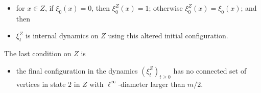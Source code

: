 \documentclass{article}
\numberwithin{equation}{section}
\begin{document}
\begin{itemize}
\item for $x \in Z$, if $\xi_0(x) = 0$, then $\xi_0^Z(x) = 1$; otherwise $\xi_0^Z(x) = \xi_0(x)$; and then
    \item $\xi_t^Z$  is internal dynamics on $Z$ using this altered initial configuration.
\end{itemize}
The last condition on $Z$ is 
\begin{itemize}[leftmargin=1.25cm]
    \item[(PR3)]
    the final configuration in the dynamics $(\xi_t^Z)_{t \geq 0}$ has no connected set of vertices in state $2$ in $Z$ with $\ell^\infty$-diameter larger than $m/2$.
\end{itemize}
\end{document}
